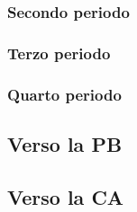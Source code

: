 \subsubsection{Secondo periodo}
\subsubsection{Terzo periodo}
\subsubsection{Quarto periodo}

\subsection{Verso la PB}

\subsection{Verso la CA}